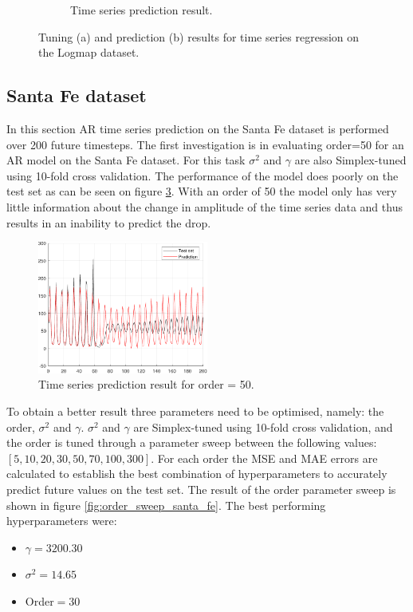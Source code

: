 \documentclass{article}
\begin{document}
\begin{figure}[h]
\begin{subfigure}[b]{0.4\textwidth}
                 \caption{Time series prediction result.}
                 \label{fig:logmap_prediction}
             \end{subfigure}
             \hspace{0.05\textwidth}
            \caption{Tuning (a) and prediction (b) results for time series regression on the Logmap dataset.}
        \end{figure}
        
    \subsection{Santa Fe dataset}
        In this section AR time series prediction on the Santa Fe dataset is performed over 200 future timesteps. The first investigation is in evaluating order=50 for an AR model on the Santa Fe dataset. For this task $\sigma^2$ and $\gamma$ are also Simplex-tuned using 10-fold cross validation. The performance of the model does poorly on the test set as can be seen on figure \ref{fig:order_50}. With an order of 50 the model only has very little information about the change in amplitude of the time series data and thus results in an inability to predict the drop. 
        \begin{figure}[h]
             \centering
             \includegraphics[width=0.5\textwidth]{Assignment 2/figures/2_3/order50.pdf}
            \caption{Time series prediction result for order = 50. }
            \label{fig:order_50}
        \end{figure}
        
        
        To obtain a better result three parameters need to be optimised, namely: the order, $\sigma^2$ and $\gamma$. $\sigma^2$ and $\gamma$ are Simplex-tuned using 10-fold cross validation, and the order is tuned through a parameter sweep between the following values: \newline $[5, 10, 20, 30, 50, 70, 100, 300]$.
         For each order the MSE and MAE errors are calculated to establish the best combination of hyperparameters to accurately predict future values on the test set. The result of the order parameter sweep is shown in figure \ref{fig:order_sweep_santa_fe}. The best performing hyperparameters were: 
        \begin{itemize}
            \item $\gamma =  3200.30$
            \item $\sigma^2 =  14.65$
            \item Order$= 30$
        \end{itemize}
        
\end{document}
